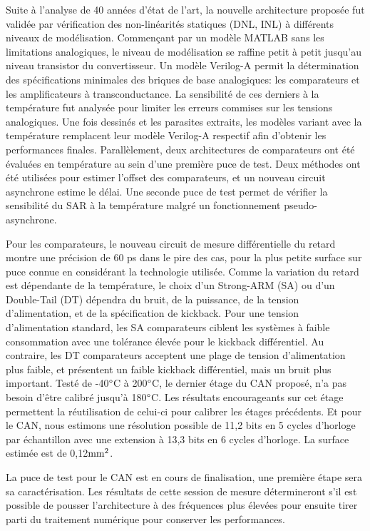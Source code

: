 \begin{mdframed}[linecolor=Prune,linewidth=1]
\begin{small}
\begin{multicols}{2}
Suite à l'analyse de 40 années d'état de l'art, la nouvelle architecture proposée fut validée par vérification des non-linéarités statiques (DNL, INL) à différents niveaux de modélisation. Commençant par un modèle MATLAB sans les limitations analogiques, le niveau de modélisation se raffine petit à petit jusqu'au niveau transistor du convertisseur. Un modèle Verilog-A permit la détermination des spécifications minimales des briques de base analogiques: les comparateurs et les amplificateurs à transconductance. La sensibilité de ces derniers à la température fut analysée pour limiter les erreurs commises sur les tensions analogiques. Une fois dessinés et les parasites extraits, les modèles variant avec la température remplacent leur modèle Verilog-A respectif afin d'obtenir les performances finales. Parallèlement, deux architectures de comparateurs ont été évaluées en température au sein d'une première puce de test. Deux méthodes ont été utilisées pour estimer l'offset des comparateurs, et un nouveau circuit asynchrone estime le délai. Une seconde puce de test permet de vérifier la sensibilité du SAR à la température malgré un fonctionnement pseudo-asynchrone.

Pour les comparateurs, le nouveau circuit de mesure différentielle du retard montre une précision de 60 ps dans le pire des cas, pour la plus petite surface sur puce connue en considérant la technologie utilisée. Comme la variation du retard est dépendante de la température, le choix d'un Strong-ARM (SA) ou d’un Double-Tail (DT) dépendra du bruit, de la puissance, de la tension d'alimentation, et de la spécification de kickback. Pour une tension d'alimentation standard, les SA comparateurs ciblent les systèmes à faible consommation avec une tolérance élevée pour le kickback différentiel. Au contraire, les DT comparateurs acceptent une plage de tension d'alimentation plus faible, et présentent un faible kickback différentiel, mais un bruit plus important. Testé de -40\(\degree \)C à 200\(\degree \)C, le dernier étage du CAN proposé, n'a pas besoin d'être calibré jusqu'à 180\(\degree \)C. Les résultats encourageants sur cet étage permettent la réutilisation de celui-ci pour calibrer les étages précédents. Et pour le CAN, nous estimons une résolution possible de 11,2 bits en 5 cycles d'horloge par échantillon avec une extension à 13,3 bits en 6 cycles d'horloge. La surface estimée est de 0,12$\rm mm^2$.

La puce de test pour le CAN est en cours de finalisation, une première étape sera sa caractérisation. Les résultats de cette session de mesure détermineront s'il est possible de pousser l'architecture à des fréquences plus élevées pour ensuite tirer parti du traitement numérique pour conserver les performances.
\end{multicols}
\end{small}
\end{mdframed}
